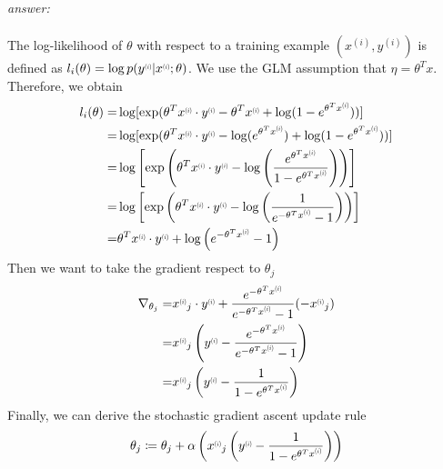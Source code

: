\documentclass{article}
\newcommand{\supi}[1]{\scalebox{0.6}[0.75]{$^{(#1)}$}}
\begin{document}
\begin{enumerate}[label=(\alph*)]
    \textit{answer:}\\\\
    The log-likelihood of $\theta$ with respect to a training example $(x^{(i)}, y^{(i)})$ is defined as $l_i(\theta) = \log p(y\supi{i} | x\supi{i}; \theta)$. We use the GLM assumption that $\eta = \theta^Tx$. Therefore, we obtain \begin{align*}
        l_i(\theta ) =& \log [\exp(\theta^Tx\supi{i}\cdot y\supi{i}-\theta^Tx\supi{i} +\log(1-e^{\theta^Tx\supi{i}}))]\\
        =&\log [\exp(\theta^Tx\supi{i}\cdot y\supi{i}-\log(e^{\theta^Tx\supi{i}}) +\log(1-e^{\theta^Tx\supi{i}}))]\\
        =&\log \left[\exp\left(\theta^Tx\supi{i}\cdot y\supi{i}-\log\left(\frac{e^{\theta^Tx\supi{i}}}{1-e^{\theta^Tx\supi{i}}}\right)\right) \right]\\
        =&\log \left[\exp\left(\theta^Tx\supi{i}\cdot y\supi{i}-\log\left(\frac{1}{e^{-\theta^Tx\supi{i}}-1}\right)\right) \right]\\
        =&\theta^Tx\supi{i}\cdot y\supi{i} +\log \left(e^{-\theta^Tx\supi{i}}-1\right)
    \end{align*}Then we want to take the gradient respect to $\theta_j$\begin{align*}
        \nabla_{\theta_j} =& x\supi{i}_j\cdot y\supi{i}+\frac{e^{-\theta^Tx\supi{i}}}{e^{-\theta^Tx\supi{i}}-1}(-x\supi{i}_j)\\
        =& x\supi{i}_j \left(y\supi{i}-\frac{e^{-\theta^Tx\supi{i}}}{e^{-\theta^Tx\supi{i}}-1}\right)\\
        =&x\supi{i}_j \left(y\supi{i}-\frac{1}{1-e^{\theta^Tx\supi{i}}}\right)
    \end{align*}Finally, we can derive the stochastic gradient ascent update rule \begin{align*}
        \theta_j \coloneqq \theta_j + \alpha\left(x\supi{i}_j \left(y\supi{i}-\frac{1}{1-e^{\theta^Tx\supi{i}}}\right)\right)
    \end{align*}
\end{enumerate}
\end{document}

